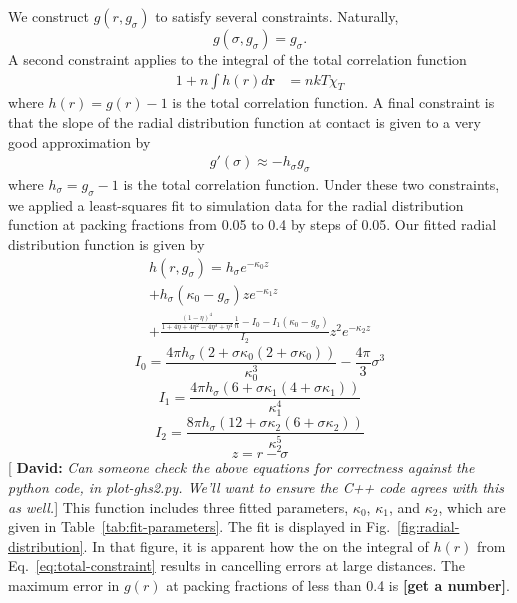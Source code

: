 \documentclass[letterpaper,twocolumn,amsmath,amssymb,pre,aps,10pt]{revtex4-1}
\newcommand{\red}[1]{{\bf \color{red} #1}}
\newcommand{\green}[1]{{\bf \color{green} #1}}
\newcommand{\rr}{\textbf{r}}
\newcommand{\fixme}[1]{\red{[#1]}}
\newcommand{\davidsays}[1]{{\color{red} [\green{David:} \emph{#1}]}}
\begin{document}
We construct $g(r, g_\sigma)$ to satisfy several constraints.  Naturally,
\begin{equation}
  g(\sigma, g_\sigma) = g_\sigma.
\end{equation}
A second constraint applies to the integral of the total correlation
function
\begin{align}
  1 + n\int h(r)d\rr &= nkT\chi_T \label{eq:total-constraint}
\end{align}
where $h(r) = g(r) - 1$ is the total correlation function.
A final constraint is that the slope of the radial distribution
function at contact is given to a very good approximation by
\begin{align}
  g'(\sigma) \approx - h_\sigma g_\sigma
\end{align}
where $h_\sigma = g_\sigma - 1$ is the total correlation function.
Under these two constraints, we applied a least-squares fit to
simulation data for the radial distribution function at packing
fractions from 0.05 to 0.4 by steps of 0.05.  Our fitted radial
distribution function is given by
\newcommand\kappaa{\kappa_0}
\newcommand\kappab{\kappa_1}
\newcommand\kappac{\kappa_2}
\begin{multline}
  h(r,g_\sigma) = h_\sigma e^{-\kappaa z} \\
  + h_\sigma(\kappaa - g_\sigma) ze^{-\kappab z} \\
  + \frac{\frac{(1-\eta)^4}{1+4\eta + 4\eta^2 - 4\eta^3 +
      \eta^4}\frac{1}{n}
    - I_0  -I_1(\kappaa - g_\sigma)}{I_2} z^2e^{-\kappac z}
\end{multline}
\begin{equation}
  I_0 = \frac{4\pi h_\sigma (2 + \sigma \kappaa (2 + \sigma \kappaa))}{\kappaa^3}
  - \frac{4\pi}{3} \sigma^3
\end{equation}
\begin{equation}
  I_1 = \frac{4\pi h_\sigma (6 + \sigma \kappab (4 + \sigma \kappab))}{\kappab^4}
\end{equation}
\begin{equation}
  I_2 = \frac{8\pi h_\sigma (12 + \sigma \kappac (6 + \sigma \kappac))}{\kappac^5}
\end{equation}
\begin{equation}
  z = r - \sigma
\end{equation}
\davidsays{Can someone check the above equations for correctness
  against the python code, in plot-ghs2.py.  We'll want to
  ensure the C++ code agrees with this as well.}
This function includes three fitted parameters, $\kappaa$, $\kappab$,
and $\kappac$, which are given in Table~\ref{tab:fit-parameters}.
The fit is displayed in Fig.~\ref{fig:radial-distribution}.  In that
figure, it is apparent how the on the integral of $h(r)$ from
Eq.~\ref{eq:total-constraint} results in cancelling errors at large
distances.  The maximum error in $g(r)$ at packing fractions of less
than 0.4 is \fixme{get a number}.
\end{document}
